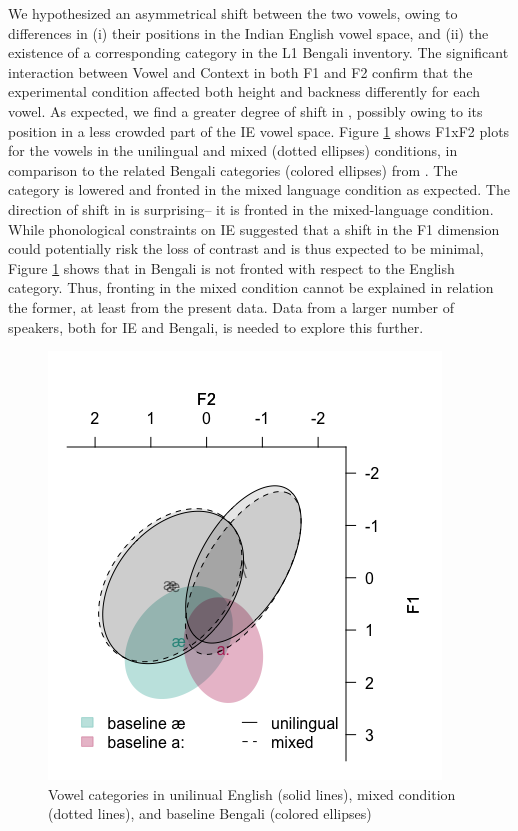 \documentclass[charis,linguex]{glossa}
\newcommand{\nt}[1]{\textipa{[#1]}} %
\begin{document}
We hypothesized an asymmetrical shift between the two vowels, owing to differences in (i) their positions in the Indian English vowel space, and (ii) the existence of a corresponding category in the L1 Bengali inventory. The significant interaction between Vowel and Context in both F1 and F2 confirm that the experimental condition affected both height and backness differently for each vowel. As expected, we find a greater degree of shift in \nt{2}, possibly owing to its position in a less crowded part of the IE vowel space.
Figure \ref{vowels_e_b} shows F1xF2 plots for the vowels in the unilingual and mixed (dotted ellipses) conditions, in comparison to the related Bengali categories (colored ellipses) from \cite{dutta2016using}.   
The category \nt{2} is lowered and fronted in the mixed language condition as expected. The direction of shift in \nt{\ae} is surprising-- it is fronted in the mixed-language condition. While phonological constraints on IE suggested that a shift in the F1 dimension could potentially risk the loss of contrast and is thus expected to be minimal, Figure \ref{vowels_e_b} shows that \nt{\ae} in Bengali is not fronted with respect to the English category. Thus, fronting in the mixed condition cannot be explained in relation the former, at least from the present data. Data from a larger number of speakers, both for IE and Bengali, is needed to explore this further. 

\begin{figure}
	
	\includegraphics[scale=0.8]{vowels_e_b_final}
	\caption{Vowel categories in unilinual English (solid lines), mixed condition (dotted lines), and baseline Bengali (colored ellipses)}
	\label{vowels_e_b}
\end{figure}
\end{document}
